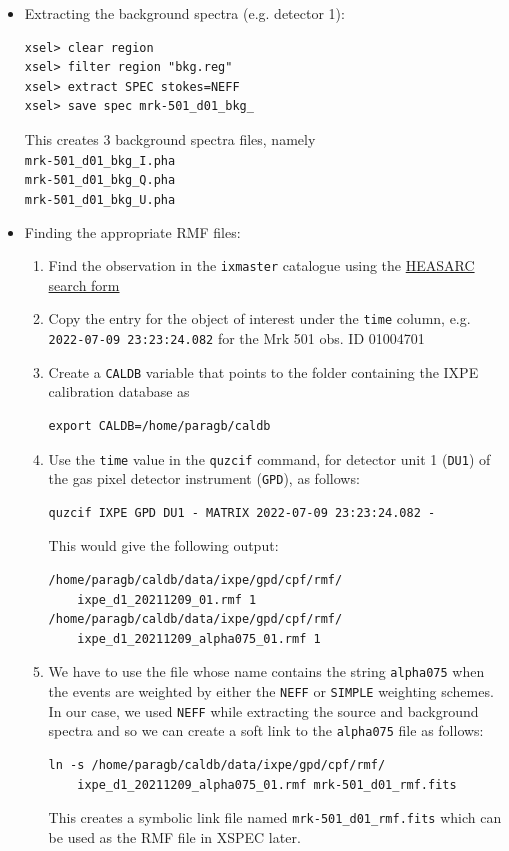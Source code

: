 \begin{itemize}
\begin{itemize}
            \item Extracting the background spectra (e.g. detector 1):
            \begin{verbatim}
xsel> clear region
xsel> filter region "bkg.reg"
xsel> extract SPEC stokes=NEFF
xsel> save spec mrk-501_d01_bkg_
            \end{verbatim}
            This creates 3 background spectra files, namely\\
            \verb|mrk-501_d01_bkg_I.pha|\\
            \verb|mrk-501_d01_bkg_Q.pha|\\
            \verb|mrk-501_d01_bkg_U.pha|

            \item Finding the appropriate RMF files:
            \begin{enumerate}
                \item Find the observation in the \verb|ixmaster| catalogue using the \href{https://heasarc.gsfc.nasa.gov/cgi-bin/W3Browse/w3browse.pl}{HEASARC search form}
                \item Copy the entry for the object of interest under the \verb|time| column, e.g. \verb|2022-07-09 23:23:24.082| for the Mrk 501 obs. ID 01004701
                \item Create a \verb|CALDB| variable that points to the folder containing the IXPE calibration database as
                \begin{verbatim}
export CALDB=/home/paragb/caldb
                \end{verbatim}
                \item Use the \verb|time| value in the \verb|quzcif| command, for detector unit 1 (\verb|DU1|) of the gas pixel detector instrument (\verb|GPD|), as follows:
                \begin{verbatim}
quzcif IXPE GPD DU1 - MATRIX 2022-07-09 23:23:24.082 -
                \end{verbatim}
                This would give the following output:
                \begin{verbatim}
/home/paragb/caldb/data/ixpe/gpd/cpf/rmf/
    ixpe_d1_20211209_01.rmf 1
/home/paragb/caldb/data/ixpe/gpd/cpf/rmf/
    ixpe_d1_20211209_alpha075_01.rmf 1
                \end{verbatim}
                
                \item We have to use the file whose name contains the string \verb|alpha075| when the events are weighted by either the \verb|NEFF| or \verb|SIMPLE|  weighting schemes. In our case, we used \verb|NEFF| while extracting the source and background spectra and so we can create a soft link to the \verb|alpha075| file as follows:
                \begin{verbatim}
ln -s /home/paragb/caldb/data/ixpe/gpd/cpf/rmf/
    ixpe_d1_20211209_alpha075_01.rmf mrk-501_d01_rmf.fits
                \end{verbatim}
                This creates a symbolic link file named \verb|mrk-501_d01_rmf.fits| which can be used as the RMF file in XSPEC later.
            \end{enumerate}


\end{itemize}
\end{itemize}
